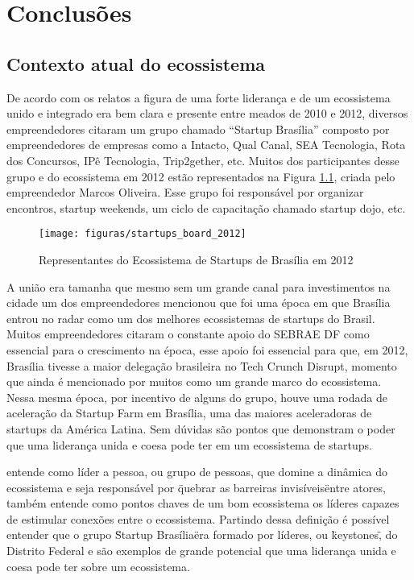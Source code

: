 \chapter[Conclusões]{Conclusões}
\label{cap-conclusoes}

\section{Contexto atual do ecossistema}
\label{contexto_atual_do_ecosssistema}

De acordo com os relatos a figura de uma forte liderança e de um ecossistema unido e integrado era bem clara e presente entre meados de 2010 e 2012, diversos empreendedores citaram um grupo chamado ``Startup Brasília'' composto por empreendedores de empresas como a Intacto, Qual Canal, SEA Tecnologia, Rota dos Concursos, IPê Tecnologia, Trip2gether, etc. Muitos dos participantes desse grupo e do ecossistema em 2012 estão representados na Figura \ref{figure:startups_board_2012}, criada pelo empreendedor Marcos Oliveira. Esse grupo foi responsável por organizar encontros, startup weekends, um ciclo de capacitação chamado startup dojo, etc.

\begin{figure}[!htb]
	\centering
	\texttt{[image: figuras/startups\_board\_2012]}
	\caption{Representantes do Ecossistema de Startups de Brasília em 2012}
	\label{figure:startups_board_2012}
\end{figure} 

A união era tamanha que mesmo sem um grande canal para investimentos na cidade um dos empreendedores mencionou que foi uma época em que Brasília entrou no radar como um dos melhores ecossistemas de startups do Brasil. Muitos empreendedores citaram o constante apoio do SEBRAE DF como essencial para o crescimento na época, esse apoio foi essencial para que, em 2012, Brasília tivesse a maior delegação brasileira no Tech Crunch Disrupt, momento que ainda é mencionado por muitos como um grande marco do ecossistema. Nessa mesma época, por incentivo de alguns do grupo, houve uma rodada de aceleração da Startup Farm em Brasília, uma das maiores aceleradoras de startups da América Latina. Sem dúvidas são pontos que demonstram o poder que uma liderança unida e coesa pode ter em um ecossistema de startups.

 entende como líder a pessoa, ou grupo de pessoas, que domine a dinâmica do ecossistema e seja responsável por \"quebrar as barreiras invisíveis\" entre atores,  também entende como pontos chaves de um bom ecossistema os líderes capazes de estimular conexões entre o ecossistema. Partindo dessa definição é possível entender que o grupo \"Startup Brasília\" era formado por líderes, ou \"keystones\", do Distrito Federal e são exemplos de grande potencial que uma liderança unida e coesa pode ter sobre um ecossistema.

